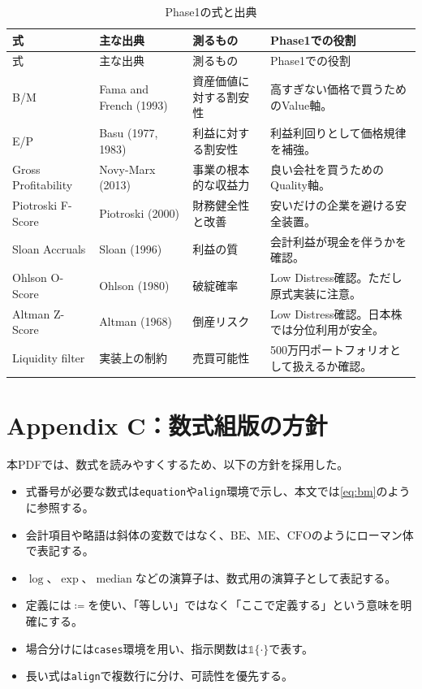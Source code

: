 \documentclass[11pt,a4paper]{article}
\newcommand{\BE}{\mathrm{BE}}
\newcommand{\ME}{\mathrm{ME}}
\newcommand{\CFO}{\mathrm{CFO}}
\newcommand{\ind}{\mathbb{1}}
\begin{document}
\begin{longtable}{p{25mm}p{38mm}p{30mm}p{63mm}}
\caption{Phase1の式と出典}\label{tab:references-formula}\\
\toprule
式 & 主な出典 & 測るもの & Phase1での役割 \\
\midrule
\endfirsthead
\toprule
式 & 主な出典 & 測るもの & Phase1での役割 \\
\midrule
\endhead
B/M & Fama and French (1993) & 資産価値に対する割安性 & 高すぎない価格で買うためのValue軸。 \\
E/P & Basu (1977, 1983) & 利益に対する割安性 & 利益利回りとして価格規律を補強。 \\
Gross Profitability & Novy-Marx (2013) & 事業の根本的な収益力 & 良い会社を買うためのQuality軸。 \\
Piotroski F-Score & Piotroski (2000) & 財務健全性と改善 & 安いだけの企業を避ける安全装置。 \\
Sloan Accruals & Sloan (1996) & 利益の質 & 会計利益が現金を伴うかを確認。 \\
Ohlson O-Score & Ohlson (1980) & 破綻確率 & Low Distress確認。ただし原式実装に注意。 \\
Altman Z-Score & Altman (1968) & 倒産リスク & Low Distress確認。日本株では分位利用が安全。 \\
Liquidity filter & 実装上の制約 & 売買可能性 & 500万円ポートフォリオとして扱えるか確認。 \\
\bottomrule
\end{longtable}

\clearpage
\section{Appendix C：数式組版の方針}

本PDFでは、数式を読みやすくするため、以下の方針を採用した。

\begin{itemize}[leftmargin=1.7em]
\item 式番号が必要な数式は\texttt{equation}や\texttt{align}環境で示し、本文では\eqref{eq:bm}のように参照する。
\item 会計項目や略語は斜体の変数ではなく、$\BE$、$\ME$、$\CFO$のようにローマン体で表記する。
\item $\log$、$\exp$、$\operatorname{median}$などの演算子は、数式用の演算子として表記する。
\item 定義には$\coloneqq$を使い、「等しい」ではなく「ここで定義する」という意味を明確にする。
\item 場合分けには\texttt{cases}環境を用い、指示関数は$\ind\{\cdot\}$で表す。
\item 長い式は\texttt{align}で複数行に分け、可読性を優先する。
\end{itemize}
\end{document}
